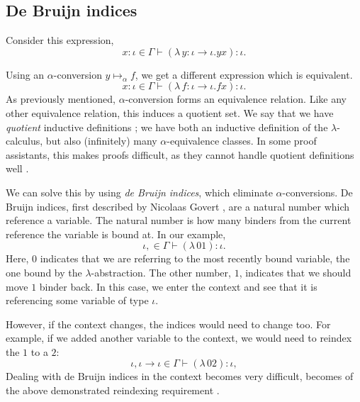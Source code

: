 \subsection{De Bruijn indices}
\label{section:background_debruijn}
Consider this expression,
\begin{equation*}
  x \colon \iota \in \Gamma \vdash (\lambda \, y \colon \iota \to \iota. y x) \colon \iota.
\end{equation*}

Using an $\alpha$-conversion $y \mapsto_{\alpha} f$, we get a different expression which is
equivalent.
\begin{equation*}
  x \colon \iota \in \Gamma \vdash (\lambda \, f \colon \iota \to \iota. f x) \colon \iota.
\end{equation*}
As previously mentioned, $\alpha$-conversion forms an equivalence relation. Like any other
equivalence relation, this induces a quotient set. We say that we have \textit{quotient} inductive
definitions \citep{aydemir_engineering_2008}; we have both an inductive definition of the
$\lambda$-calculus, but also (infinitely) many $\alpha$-equivalence classes. In some proof
assistants, this makes proofs difficult, as they cannot handle quotient definitions well
\citep{pitts_locally_2023}.

We can solve this by using \textit{de Bruijn indices}, which eliminate $\alpha$-conversions. De
Bruijn indices, first described by Nicolaas Govert \citet{de_bruijn_lambda_1972}, are a natural
number which reference a variable. The natural number is how many binders from the current reference
the variable is bound at. In our example,
\begin{equation*}
  \iota, \in \Gamma \vdash (\lambda \, 0 1) \colon \iota.
\end{equation*}
Here, $0$ indicates that we are referring to the most recently bound variable, the one bound by the
$\lambda$-abstraction. The other number, $1$, indicates that we should move $1$ binder back. In this
case, we enter the context and see that it is referencing some variable of type $\iota$.

However, if the context changes, the indices would need to change too. For example, if we added
another variable to the context, we would need to reindex the $1$ to a $2$:
\begin{equation*}
  \iota, \iota \to \iota \in \Gamma \vdash (\lambda \, 0 2) \colon \iota,
\end{equation*}
Dealing with de Bruijn indices in the context becomes very difficult, becomes of the above
demonstrated reindexing requirement \citep[section~2.1]{aydemir_engineering_2008}.

